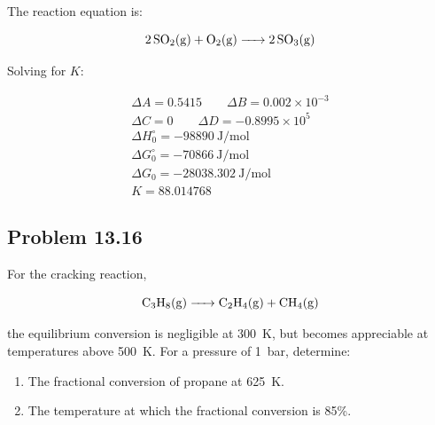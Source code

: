 \begin{solution}
  The reaction equation is:

  \begin{equation*}
    \ce{2SO2(g) + O2(g) -> 2SO3(g)}
  \end{equation*}

  Solving for \(K\):

  \begin{gather*}
    \Delta A = 0.5415 \qquad \Delta B = 0.002 \times 10^{-3} \\
    \Delta C = 0 \qquad \Delta D = -0.8995 \times 10^{5} \\
    \Delta H_0^\circ = -98890~\unit{\joule\per\mole} \\
    \Delta G_0^\circ = -70866~\unit{\joule\per\mole} \\
    \Delta G_0 = -28038.302~\unit{\joule\per\mole} \\
    K = 88.014768
  \end{gather*}

\end{solution}

\subsection*{Problem 13.16}

For the cracking reaction,

\begin{equation*}
  \ce{C3H8(g) -> C2H4(g) + CH4(g)}
\end{equation*}

the equilibrium conversion is negligible at 300~\unit{\kelvin}, but becomes
appreciable at temperatures above 500~\unit{\kelvin}. For a pressure
of 1~\unit{\bar}, determine:

\begin{enumerate}[label=(\alph*)]
  \item The fractional conversion of propane at 625~\unit{\kelvin}.
  \item The temperature at which the fractional conversion is 85\%.
\end{enumerate}

\begin{solution}

\end{solution}
